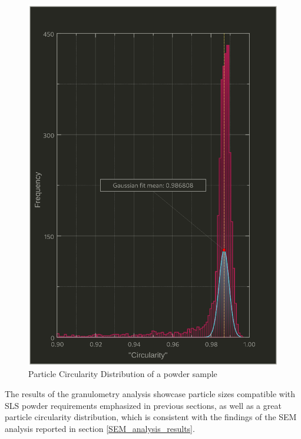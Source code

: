 \documentclass{article}
\begin{document}
        \begin{figure}[ht]
            \centering
            \includegraphics[width=\textwidth]{Pictures/Granulometry_plots/Histogram_Circularity.eps}
            \caption{Particle Circularity Distribution of a powder sample}
            \label{fig:circularity_distribution}
        \end{figure}
  
      \clearpage
  
      The results of the granulometry analysis showcase particle sizes compatible with SLS powder requirements emphasized in previous sections, 
      as well as a great particle circularity distribution, which is consistent with the findings of the 
      SEM analysis reported in section \ref{SEM_analysis_results}. \\
  
\end{document}
